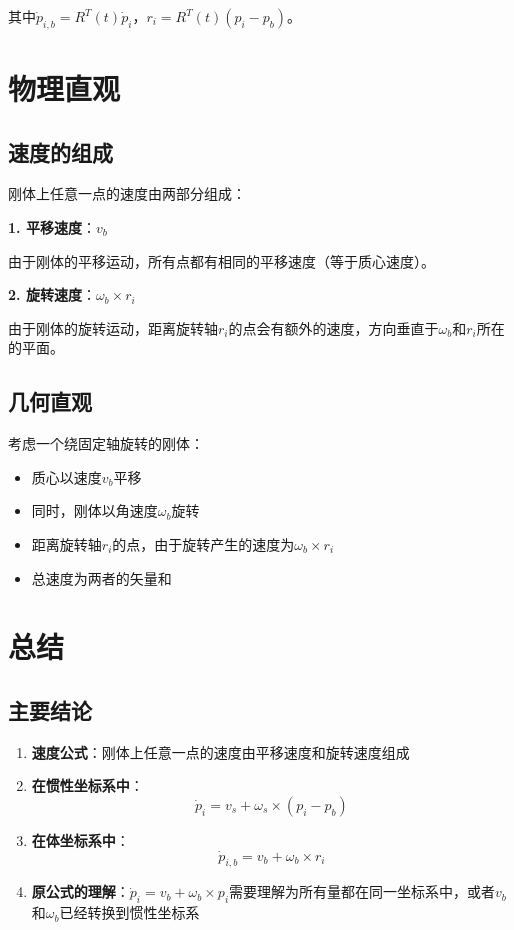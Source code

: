 \documentclass[12pt,a4paper]{article}
\begin{document}
其中$\dot{p}_{i,b} = R^T(t) \dot{p}_i$，$r_i = R^T(t) (p_i - p_b)$。

\section{物理直观}

\subsection{速度的组成}

刚体上任意一点的速度由两部分组成：

\textbf{1. 平移速度}：$v_b$

由于刚体的平移运动，所有点都有相同的平移速度（等于质心速度）。

\textbf{2. 旋转速度}：$\omega_b \times r_i$

由于刚体的旋转运动，距离旋转轴$r_i$的点会有额外的速度，方向垂直于$\omega_b$和$r_i$所在的平面。

\subsection{几何直观}

考虑一个绕固定轴旋转的刚体：

\begin{itemize}
\item 质心以速度$v_b$平移
\item 同时，刚体以角速度$\omega_b$旋转
\item 距离旋转轴$r_i$的点，由于旋转产生的速度为$\omega_b \times r_i$
\item 总速度为两者的矢量和
\end{itemize}

\section{总结}

\subsection{主要结论}

\begin{enumerate}
\item \textbf{速度公式}：刚体上任意一点的速度由平移速度和旋转速度组成

\item \textbf{在惯性坐标系中}：
\begin{equation}
\dot{p}_i = v_s + \omega_s \times (p_i - p_b)
\end{equation}

\item \textbf{在体坐标系中}：
\begin{equation}
\dot{p}_{i,b} = v_b + \omega_b \times r_i
\end{equation}

\item \textbf{原公式的理解}：$\dot{p}_i = v_b + \omega_b \times p_i$需要理解为所有量都在同一坐标系中，或者$v_b$和$\omega_b$已经转换到惯性坐标系
\end{enumerate}
\end{document}
